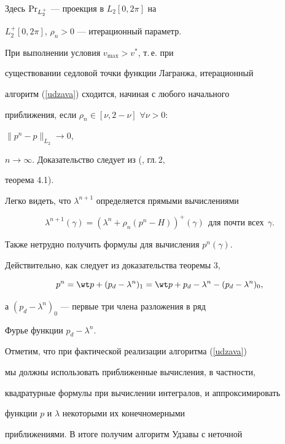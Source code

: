 Здесь $\operatorname{Pr}_{L_{2}^{+}}$ --- проекция в $L_{2}[0,2\pi]$ на


$L_{2}^{+}[0,2\pi]$, $\rho_{n}>0$ --- итерационный параметр.





При выполнении условия $v_{\max}>v^{*}$, т.\,е. при


существовании седловой точки функции Лагранжа, итерационный


алгоритм (\ref{udzava}) сходится, начиная с любого начального


приближения, если $\rho_{n}\in [\nu, 2-\nu]$ $\forall \nu>0$:


$\| p^{n}-p\| _{L_{2}} \to 0$,


$n\to\infty$. Доказательство следует из (\cite{Glova}, гл.\,2,


теорема 4.1).





Легко видеть, что $\lambda^{n+1}$ определяется прямыми вычислениями


$$


\lambda^{n+1}(\gamma)=(\lambda^{n}+\rho_{n}(p^{n}-H))^{+}(\gamma)\ \


\text{для почти всех} \ \ \gamma.


$$


Также нетрудно получить формулы для вычисления $p^{n}(\gamma)$.


Действительно, как следует из доказательства теоремы 3,


$$


p^{n}=\wt p+(p_{d}-\lambda^{n})_1=\wt p


+p_{d}-\lambda^{n}-(p_{d}-\lambda^{n})_0,


$$


а $(p_{d}-\lambda^{n})_0$ --- первые три члена разложения в ряд


Фурье функции $p_{d}-\lambda^{n}$.





Отметим, что при фактической реализации алгоритма (\ref{udzava})


мы должны использовать приближенные вычисления, в частности,


квадратурные формулы при вычислении интегралов, и аппроксимировать


функции $p$ и $\lambda$ некоторыми их конечномерными


приближениями. В итоге получим алгоритм Удзавы с неточной


